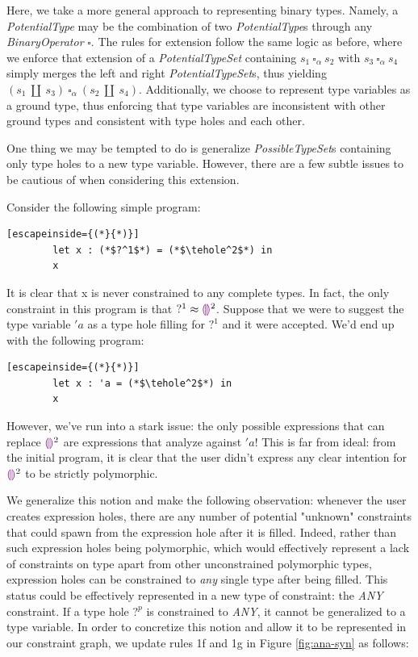 Here, we take a more general approach to representing binary types. Namely, a \emph{PotentialType} may be the combination of two \emph{PotentialType}s through any \emph{BinaryOperator} $\square$. The rules for extension follow the same logic as before, where we enforce that extension of a \emph{PotentialTypeSet} containing $s_1 ~\square_{\alpha}~ s_2$ with $s_3 ~\square_{\alpha}~ s_4$ simply merges the left and right \emph{PotentialTypeSet}s, thus yielding $(s_1 ~\amalg~ s_3) ~\square_{\alpha}~ (s_2 ~\amalg~ s_4)$. Additionally, we choose to represent type variables as a ground type, thus enforcing that type variables are inconsistent with other ground types and consistent with type holes and each other. 

One thing we may be tempted to do is generalize \emph{PossibleTypeSet}s containing only type holes to a new type variable. However, there are a few subtle issues to be cautious of when considering this extension.

Consider the following simple program:

\begin{center}
    \begin{lstlisting}[escapeinside={(*}{*)}]
        let x : (*$?^1$*) = (*$\tehole^2$*) in
        x
    \end{lstlisting}
\end{center}

It is clear that x is never constrained to any complete types. In fact, the only constraint in this program is that $?^1 \approx \textcolor{violet}{\llparenthesis}\textcolor{violet}{\rrparenthesis}^2$. Suppose that we were to suggest the type variable $'a$ as a type hole filling for $?^1$ and it were accepted. We'd end up with the following program:

\begin{center}
    \begin{lstlisting}[escapeinside={(*}{*)}]
        let x : 'a = (*$\tehole^2$*) in
        x
    \end{lstlisting}
\end{center}

However, we've run into a stark issue: the only possible expressions that can replace $\textcolor{violet}{\llparenthesis}\textcolor{violet}{\rrparenthesis}^2$ are expressions that analyze against $'a$! This is far from ideal: from the initial program, it is clear that the user didn't express any clear intention for $\textcolor{violet}{\llparenthesis}\textcolor{violet}{\rrparenthesis}^2$ to be strictly polymorphic. 

We generalize this notion and make the following observation: whenever the user creates expression holes, there are any number of potential "unknown" constraints that could spawn from the expression hole after it is filled. Indeed, rather than such expression holes being polymorphic, which would effectively represent a lack of constraints on type apart from other unconstrained polymorphic types, expression holes can be constrained to \emph{any} single type after being filled. This status could be effectively represented in a new type of constraint: the \emph{ANY} constraint. If a type hole $?^p$ is constrained to \emph{ANY}, it cannot be generalized to a type variable. In order to concretize this notion and allow it to be represented in our constraint graph, we update rules 1f and 1g in Figure \ref{fig:ana-syn} as follows:


